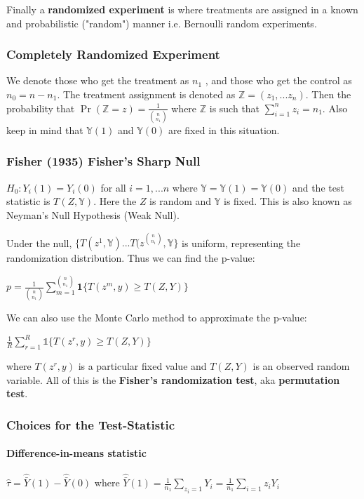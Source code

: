 \documentclass[11pt]{elegantbook}
\begin{document}
    Finally a \textbf{randomized experiment} is where treatments are assigned in a known and probabilistic ("random") manner i.e. Bernoulli random experiments.

 \subsubsection{Completely Randomized Experiment}
    We denote those who get the treatment as $n_1$ , and those who get the control as $n_0 = n - n_1$. The treatment assignment is denoted as $\mathbb{Z}= (z_1, ... z_n)$.  Then the probability that $\Pr(\mathbb{Z}=z ) = \frac{1}{\binom{n}{n_1}}$ where $\mathbb{Z}$ is such that $\sum_{i=1}^{n} z_i = n_1$. Also keep in mind that $\mathbb{Y}(1)$ and $\mathbb{Y}(0)$ are fixed in this situation.

\subsubsection{Fisher (1935) Fisher's Sharp Null}
    $H_0: Y_i(1) = Y_i(0)$ for all $i = 1,...n$ where $\mathbb{Y} = \mathbb{Y}(1) = \mathbb{Y}(0)$ and the test statistic is $T(Z, \mathbb{Y})$. Here the $Z$ is random and $\mathbb{Y}$ is fixed. This is also known as Neyman's Null Hypothesis (Weak Null).
    
    Under the null, $\{T(z^1, \mathbb{Y})...T(z^{\binom{n}{n_1}}, \mathbb{Y}\}$ is uniform, representing the randomization distribution. Thus we can find the p-value:
    \begin{center} 
    $p = \frac{1}{\binom{n}{n_1}} \sum_{m=1}^{\binom{n}{n_1}} \mathbf{1}\{T(z^m,y) \geq T(Z, Y)\}$ 
    \end{center}
    We can also use the Monte Carlo method to approximate the p-value:
     \begin{center} 
     $\frac{1}{R} \sum_{r=1}^{R} \mathbb{1}\{T(z^r,y) \geq T(Z, Y)\}$ 
     \end{center}
     where $T(z^r,y) $ is a particular fixed value and $T(Z, Y)$ is an observed random variable.
     All of this is the \textbf{Fisher's randomization test}, aka \textbf{permutation test}.
     
 \subsubsection{Choices for the Test-Statistic}
 \paragraph{Difference-in-means statistic} 
$\hat{\tau} = \hat{\bar{Y}}(1) - \hat{\bar{Y}}(0)$ where $\hat{\bar{Y}}(1) = \frac{1}{n_1}\sum_{z_i=1}Y_i = \frac{1}{n_1}\sum_{i=1}z_iY_i $ 
\end{document}
